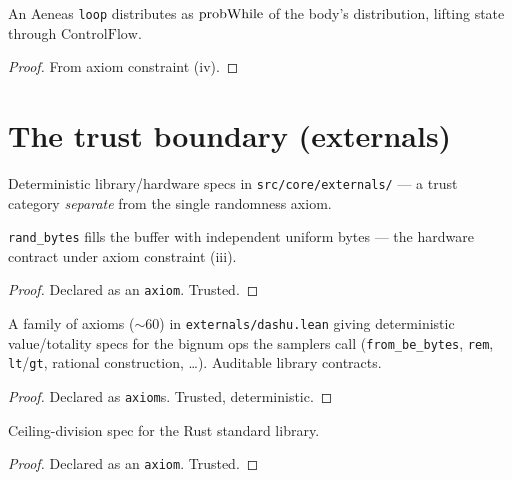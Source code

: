 \begin{lemma}\label{thm:samplerDist-loop}
  \leanok
  An Aeneas \texttt{loop} distributes as \(\mathrm{probWhile}\) of the body's
  distribution, lifting state through \(\mathrm{ControlFlow}\). \statusDone
\end{lemma}
\begin{proof}\leanok From axiom constraint (iv). \end{proof}

\chapter{The trust boundary (externals)}\label{chap:externals}

Deterministic library/hardware specs in \texttt{src/core/externals/} --- a trust
category \emph{separate} from the single randomness axiom.

\begin{theorem}\label{ax:openssl}
  \leanok
  \statusAxiom{} \texttt{rand\_bytes} fills the buffer with independent uniform
  bytes --- the hardware contract under axiom constraint (iii). \statusDone
\end{theorem}
\begin{proof}\leanok Declared as an \texttt{axiom}. Trusted. \end{proof}

\begin{theorem}\label{ax:dashu}
  \leanok
  \statusAxiom{} A family of axioms (\(\sim 60\)) in \texttt{externals/dashu.lean}
  giving deterministic value/totality specs for the bignum ops the samplers call
  (\texttt{from\_be\_bytes}, \texttt{rem}, \texttt{lt}/\texttt{gt}, rational
  construction, \ldots). Auditable library contracts. \statusDone
\end{theorem}
\begin{proof}\leanok Declared as \texttt{axiom}s. Trusted, deterministic. \end{proof}

\begin{theorem}\label{ax:divceil}
  \leanok
  \statusAxiom{} Ceiling-division spec for the Rust standard library. \statusDone
\end{theorem}
\begin{proof}\leanok Declared as an \texttt{axiom}. Trusted. \end{proof}

